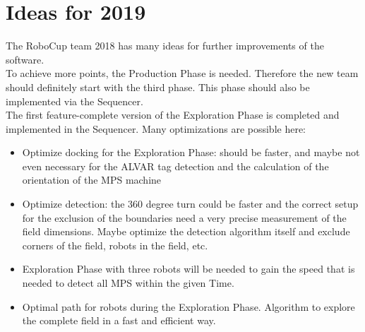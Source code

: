 \section{Ideas for 2019}

The RoboCup team 2018 has many ideas for further improvements of the software.\\

To achieve more points, the Production Phase is needed. Therefore the new team should definitely start with the third phase. This phase should also be implemented via the Sequencer. \\

The first feature-complete version of the Exploration Phase is completed and implemented in the Sequencer. Many optimizations are possible here:
\begin{itemize}
\item Optimize docking for the Exploration Phase: should be faster, and maybe not even necessary for the ALVAR tag detection and the calculation of the orientation of the MPS machine
\item Optimize detection: the 360 degree turn could be faster and the correct setup for the exclusion of the boundaries need a very precise measurement of the field dimensions. Maybe optimize the detection algorithm itself and exclude corners of the field, robots in the field, etc.
\item Exploration Phase with three robots will be needed to gain the speed that is needed to detect all MPS within the given Time.
\item Optimal path for robots during the Exploration Phase. Algorithm to explore the complete field in a fast and efficient way.
\end{itemize}
